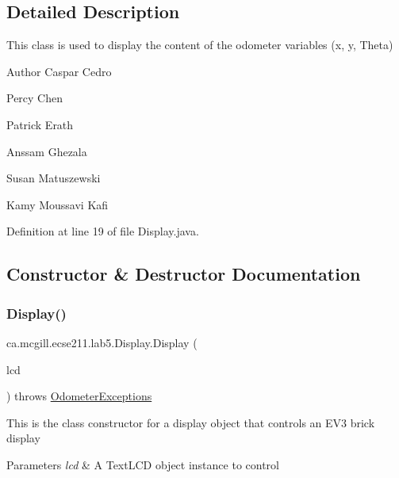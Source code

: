 \subsection{Detailed Description}
This class is used to display the content of the odometer variables (x, y, Theta)

\begin{DoxyAuthor}{Author}
Caspar Cedro 

Percy Chen 

Patrick Erath 

Anssam Ghezala 

Susan Matuszewski 

Kamy Moussavi Kafi 
\end{DoxyAuthor}


Definition at line 19 of file Display.\+java.



\subsection{Constructor \& Destructor Documentation}
\mbox{\label{classca_1_1mcgill_1_1ecse211_1_1lab5_1_1_display_aeb15906f02c60c1ca449d4c37922739b}} 
\subsubsection{\texorpdfstring{Display()}{Display()}\hspace{0.1cm}{\footnotesize\ttfamily [1/2]}}
{\footnotesize\ttfamily ca.\+mcgill.\+ecse211.\+lab5.\+Display.\+Display (\begin{DoxyParamCaption}\item[{Text\+L\+CD}]{lcd }\end{DoxyParamCaption}) throws \hyperlink{classca_1_1mcgill_1_1ecse211_1_1odometer_1_1_odometer_exceptions}{Odometer\+Exceptions}}

This is the class constructor for a display object that controls an E\+V3 brick display


\begin{DoxyParams}{Parameters}
{\em lcd} & A Text\+L\+CD object instance to control \\
\hline
\end{DoxyParams}

